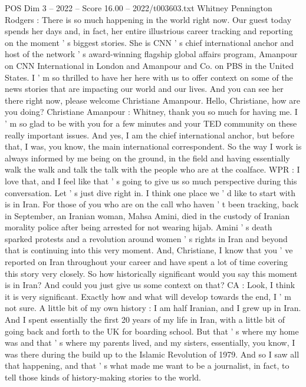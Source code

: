 \begin{textsample}{POS Dim 3 – 2022 – Score 16.00 – 2022/t003603.txt}  \label{ex:f3_pos_020}
Whitney Pennington Rodgers : There is so much happening in the world right now.
Our guest today spends her days and, in fact, her entire illustrious career tracking and reporting on the moment ' s biggest stories.
She is CNN ' s chief international anchor and host of the network ' s award-winning flagship global affairs program, Amanpour on CNN International in London and Amanpour and Co. on PBS in the United States.
I ' m so thrilled to have her here with us to offer context on some of the news stories that are impacting our world and our lives.
And you can see her there right now, please welcome Christiane Amanpour.
Hello, Christiane, how are you doing?
Christiane Amanpour : Whitney, thank you so much for having me.
I ' m so glad to be with you for a few minutes and your TED community on these really important issues.
And yes, I am the chief international anchor, but before that, I was, you know, the main international correspondent.
So the way I work is always informed by me being on the ground, in the field and having essentially walk the walk and talk the talk with the people who are at the coalface.
WPR : I love that, and I feel like that ' s going to give us so much perspective during this conversation.
Let ' s just dive right in.
I think one place we ' d like to start with is in Iran.
For those of you who are on the call who haven ' t been tracking, back in September, an Iranian woman, Mahsa Amini, died in the custody of Iranian morality police after being arrested for not wearing hijab.
Amini ' s death sparked protests and a revolution around women ' s rights in Iran and beyond that is continuing into this very moment.
And, Christiane, I know that you ' ve reported on Iran throughout your career and have spent a lot of time covering this story very closely.
So how historically significant would you say this moment is in Iran?
And could you just give us some context on that?
CA : Look, I think it is very significant.
Exactly how and what will develop towards the end, I ' m not sure.
A little bit of my own history : I am half Iranian, and I grew up in Iran.
And I spent essentially the first 20 years of my life in Iran, with a little bit of going back and forth to the UK for boarding school.
But that ' s where my home was and that ' s where my parents lived, and my sisters, essentially, you know, I was there during the build up to the Islamic Revolution of 1979.
And so I saw all that happening, and that ' s what made me want to be a journalist, in fact, to tell those kinds of history-making stories to the world.

\end{textsample}
